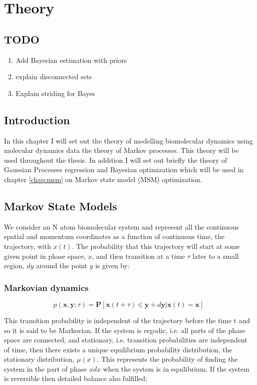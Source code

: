 %
\let\textcircled=\pgftextcircled
\chapter{Theory}
\label{chap:theory}

\section{TODO}
\begin{enumerate}
    \item Add Bayesian estimation with priors
    \item explain disconnected sets
    \item Explain striding for Bayes
\end{enumerate}

\section{Introduction}
In this chapter I will set out the theory of modelling biomolecular dynamics using molecular dynamics data the theory of Markov processes. This theory will be used throughout the thesis. In addition I will set out briefly the theory of Gaussian Processes regression and Bayesian optimization which will be used in chapter \ref{chap:msm} on Markov state model (MSM) optimization. 

\section{Markov State Models}
We consider an N atom biomolecular system and represent all the continuous spatial and momentum coordinates as a function of continuous time, the trajectory, with $x(t)$. The probability that this trajectory will start at some given point in phase space, $x$, and then transition at a time $\tau$ later to a small region, $dy$ around the point $y$ is given by: 

\subsection{Markovian dynamics}
\begin{equation}
p(\mathbf{x}, \mathbf{y} ; \tau)=\mathbf{P}[\mathbf{x}(t+\tau) \in \mathbf{y}+d \mathbf{y} | \mathbf{x}(t)=\mathbf{x}]
\end{equation}

This transition probability is independent of the trajectory before the time t and so it is said to be Markovian. If the system is ergodic, i.e. all parts of the phase space are connected, and stationary, i.e. transition probabilities are independent of time, then there exists a unique equilibrium probability distribution, the stationary distribution, $\mu(x)$. This represents the probability of finding the system in the part of phase $x dx$ when the system is in equilibrium. If the system is reversible then detailed balance also fulfilled: 

